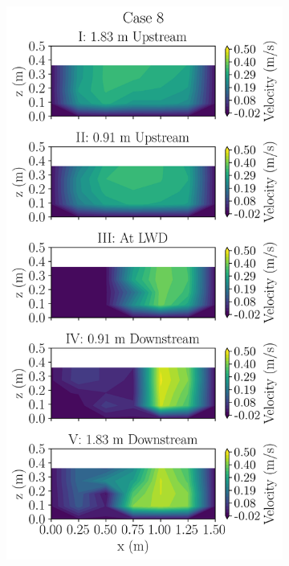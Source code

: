 \documentclass[preview, border=2pt]{standalone}
\begin{document}
\begin{figure}
\begin{subfigure}[b]{0.24\textwidth}
     \end{subfigure}
     \hfill     
     \begin{subfigure}[b]{0.24\textwidth}
         \centering
         \caption{}
         \includegraphics[width=\textwidth]{Case8_velocity_contours.png}

\end{subfigure}
\end{figure}
\end{document}
